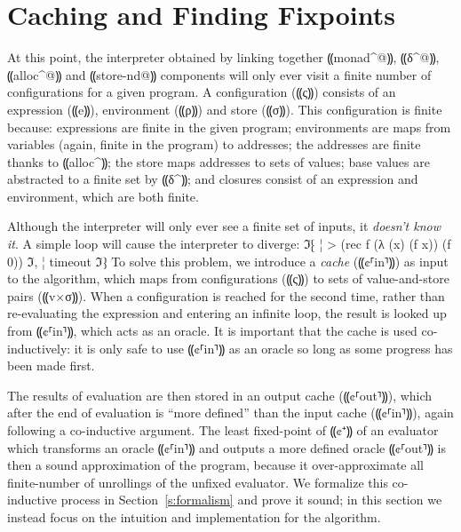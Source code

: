 \section{Caching and Finding Fixpoints}\label{s:cache}

At this point, the interpreter obtained by linking together ⸨monad^@⸩, ⸨δ^@⸩,
⸨alloc^@⸩ and ⸨store-nd@⸩ components will only ever visit a finite number of
configurations for a given program. A configuration (⸨ς⸩) consists of an
expression (⸨e⸩), environment (⸨ρ⸩) and store (⸨σ⸩). This configuration is
finite because: expressions are finite in the given program; environments are
maps from variables (again, finite in the program) to addresses; the addresses
are finite thanks to ⸨alloc^⸩; the store maps addresses to sets of values; base
values are abstracted to a finite set by ⸨δ^⸩; and closures consist of an
expression and environment, which are both finite.

Although the interpreter will only ever see a finite set of inputs, it
\emph{doesn't know it}.  A simple loop will cause the interpreter to diverge:
ℑ⁅
¦ > (rec f (λ (x) (f x)) (f 0))
ℑ,
¦ timeout
ℑ⁆
To solve this problem, we introduce a \emph{cache} (⸨¢⸢in⸣⸩) as input to the
algorithm, which maps from configurations (⸨ς⸩) to sets of value-and-store
pairs (⸨v×σ⸩). When a configuration is reached for the second time, rather than
re-evaluating the expression and entering an infinite loop, the result is
looked up from ⸨¢⸢in⸣⸩, which acts as an oracle. It is important that the cache
is used co-inductively: it is only safe to use ⸨¢⸢in⸣⸩ as an oracle so long as
some progress has been made first. 

The results of evaluation are then stored in an output cache (⸨¢⸢out⸣⸩), which
after the end of evaluation is “more defined” than the input cache (⸨¢⸢in⸣⸩),
again following a co-inductive argument. The least fixed-point of ⸨¢⁺⸩ of an
evaluator which transforms an oracle ⸨¢⸢in⸣⸩ and outputs a more defined oracle
⸨¢⸢out⸣⸩ is then a sound approximation of the program, because it
over-approximate all finite-number of unrollings of the unfixed evaluator. We
formalize this co-inductive process in Section~\ref{s:formalism} and prove it
sound; in this section we instead focus on the intuition and implementation for
the algorithm.

